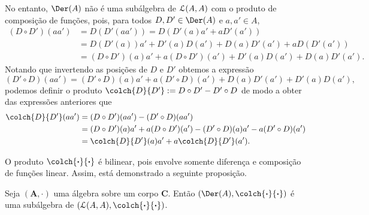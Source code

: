 No entanto, $\Der(A)$ não é uma subálgebra de $\mathcal{L}(A,A)$ com o produto de composição de funções, pois, para todos $D,D' \in \Der(A)$ e $a,a' \in A$,
	\begin{align*}
	(D \circ D')(aa') &= D(D'(aa')) = D(D'(a)a' + aD'(a')) \\
		&= D(D'(a))a' + D'(a)D(a') + D(a)D'(a') + a D(D'(a')) \\
		&= (D \circ D')(a)a' + a (D \circ D')(a') + D'(a)D(a') + D(a)D'(a').
	\end{align*}
Notando que invertendo as posições de $D$ e $D'$ obtemos a expressão
	\begin{equation*}
	(D' \circ D)(aa') = (D' \circ D)(a)a' + a (D' \circ D)(a') + D(a)D'(a') + D'(a)D(a'),
	\end{equation*}
podemos definir o produto $\colch{D}{D'} := D \circ D' - D' \circ D$ de modo a obter das expressões anteriores que
	\begin{align*}
	\colch{D}{D'}(aa') &= (D \circ D')(aa') - (D' \circ D)(aa') \\
		&= (D \circ D')(a)a' + a (D \circ D')(a') - (D' \circ D)(a)a' - a (D' \circ D)(a') \\
		&= \colch{D}{D'}(a)a' + a\colch{D}{D'}(a').
	\end{align*}

O produto $\colch{\var}{\var}$ é bilinear, pois envolve somente diferença e composição de funções linear. Assim, está demonstrado a seguinte proposição.

\begin{prop}
\label{alge:prop.algebra.colchete.deriv}
Seja $(\bm A,\cdot)$ uma álgebra sobre um corpo $\bm C$. Então $(\Der(A),\colch{\var}{\var})$ é uma subálgebra de $(\lin(A,A),\colch{\var}{\var})$.
\end{prop}
